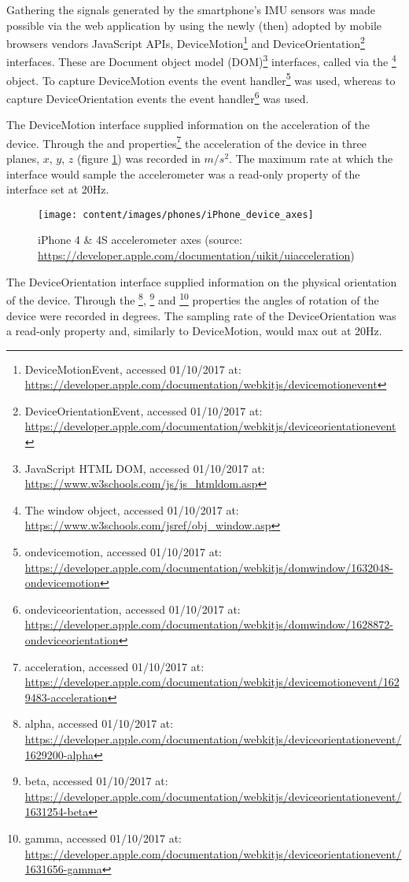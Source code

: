 Gathering the signals generated by the smartphone's \gls{IMU} sensors was made possible via the web application by using the newly (then) adopted by mobile browsers vendors JavaScript \gls{API}s, DeviceMotion\footnote{DeviceMotionEvent, accessed 01/10/2017 at: \url{https://developer.apple.com/documentation/webkitjs/devicemotionevent}} and DeviceOrientation\footnote{DeviceOrientationEvent, accessed 01/10/2017 at: \url{https://developer.apple.com/documentation/webkitjs/deviceorientationevent}} interfaces. These are Document object model (\gls{DOM})\footnote{JavaScript HTML DOM, accessed 01/10/2017 at: \url{https://www.w3schools.com/js/js_htmldom.asp}} interfaces, called via the \footnote{The window object, accessed 01/10/2017 at: \url{https://www.w3schools.com/jsref/obj_window.asp}} object. To capture DeviceMotion events the  event handler\footnote{ondevicemotion, accessed 01/10/2017 at: \url{https://developer.apple.com/documentation/webkitjs/domwindow/1632048-ondevicemotion}} was used, whereas to capture DeviceOrientation events the  event handler\footnote{ondeviceorientation, accessed 01/10/2017 at: \url{https://developer.apple.com/documentation/webkitjs/domwindow/1628872-ondeviceorientation}} was used. 

The DeviceMotion interface supplied information on the acceleration of the device. Through the  and  properties\footnote{acceleration, accessed 01/10/2017 at: \url{https://developer.apple.com/documentation/webkitjs/devicemotionevent/1629483-acceleration}} the acceleration of the device in three planes, $x$, $y$, $z$ (figure \ref{fig:iphoneAxes}) was recorded in $m/s^{2}$. The maximum rate at which the interface would sample the accelerometer was a read-only property of the interface set at 20Hz.

\begin{figure}[h]
	\centering
	\texttt{[image: content/images/phones/iPhone\_device\_axes]}
	\caption{iPhone 4 \& 4S accelerometer axes (source: \url{https://developer.apple.com/documentation/uikit/uiacceleration})}
	\label{fig:iphoneAxes}
\end{figure}

The DeviceOrientation interface supplied information on the physical orientation of the device. Through the \footnote{alpha, accessed 01/10/2017 at: \url{https://developer.apple.com/documentation/webkitjs/deviceorientationevent/1629200-alpha}}, \footnote{beta, accessed 01/10/2017 at: \url{https://developer.apple.com/documentation/webkitjs/deviceorientationevent/1631254-beta}} and \footnote{gamma, accessed 01/10/2017 at: \url{https://developer.apple.com/documentation/webkitjs/deviceorientationevent/1631656-gamma}} properties the angles of rotation of the device were recorded in degrees. The sampling rate of the DeviceOrientation was a read-only property and, similarly to DeviceMotion, would max out at 20Hz. 


